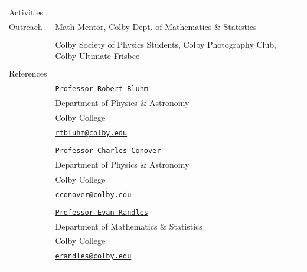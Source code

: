 \documentclass[10pt]{article}
\begin{document}
\begin{longtable}{ l m{13.5cm}   }
  \large{Activities}    & \\ 
  \large{Outreach}		& Math Mentor, Colby Dept. of Mathematics \& Statistics \\
  						& \\
  						& Colby Society of Physics Students, Colby Photography Club, Colby Ultimate Frisbee \\
     					& \\

\newpage

  \large{References}	& \\
  						& \href{http://www.colby.edu/physics/faculty/robert.html}{\texttt{Professor Robert Bluhm}} \\
  						& Department of Physics \& Astronomy \\
  						& Colby College \\
  						& {\href{mailto:rtbluhm@colby.edu}{\texttt{rtbluhm@colby.edu}}} \\
  						&  \\
  						
  						
  						& \href{https://www.colby.edu/directory/profile/charles.conover/}{\texttt{Professor Charles Conover}} \\
  						& Department of Physics \& Astronomy \\
  						& Colby College \\
  						& {\href{mailto:cconover@colby.edu}{\texttt{cconover@colby.edu}}}\\
  						& \\
  						
  						
  						
  						& \href{https://personal.colby.edu/~erandles/}{\texttt{Professor Evan Randles}} \\
  						& Department of Mathematics \& Statistics \\
  						& Colby College \\
  						& {\href{mailto:erandles@colby.edu}{\texttt{erandles@colby.edu}}} \\
  						& \\
  						
  						
  
  
\end{longtable}
\end{document}
